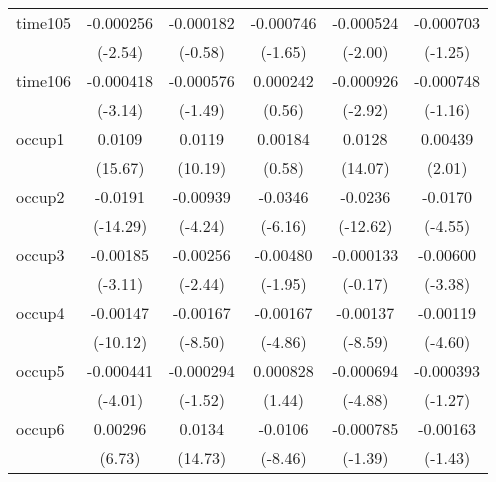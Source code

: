 \begin{table}[htbp]
\begin{tabular}{l*{5}{c}}
time105     &   -0.000256\sym{*}  &   -0.000182         &   -0.000746         &   -0.000524\sym{*}  &   -0.000703         \\
            &     (-2.54)         &     (-0.58)         &     (-1.65)         &     (-2.00)         &     (-1.25)         \\
time106     &   -0.000418\sym{**} &   -0.000576         &    0.000242         &   -0.000926\sym{**} &   -0.000748         \\
            &     (-3.14)         &     (-1.49)         &      (0.56)         &     (-2.92)         &     (-1.16)         \\
occup1      &      0.0109\sym{***}&      0.0119\sym{***}&     0.00184         &      0.0128\sym{***}&     0.00439\sym{*}  \\
            &     (15.67)         &     (10.19)         &      (0.58)         &     (14.07)         &      (2.01)         \\
occup2      &     -0.0191\sym{***}&    -0.00939\sym{***}&     -0.0346\sym{***}&     -0.0236\sym{***}&     -0.0170\sym{***}\\
            &    (-14.29)         &     (-4.24)         &     (-6.16)         &    (-12.62)         &     (-4.55)         \\
occup3      &    -0.00185\sym{**} &    -0.00256\sym{*}  &    -0.00480         &   -0.000133         &    -0.00600\sym{***}\\
            &     (-3.11)         &     (-2.44)         &     (-1.95)         &     (-0.17)         &     (-3.38)         \\
occup4      &    -0.00147\sym{***}&    -0.00167\sym{***}&    -0.00167\sym{***}&    -0.00137\sym{***}&    -0.00119\sym{***}\\
            &    (-10.12)         &     (-8.50)         &     (-4.86)         &     (-8.59)         &     (-4.60)         \\
occup5      &   -0.000441\sym{***}&   -0.000294         &    0.000828         &   -0.000694\sym{***}&   -0.000393         \\
            &     (-4.01)         &     (-1.52)         &      (1.44)         &     (-4.88)         &     (-1.27)         \\
occup6      &     0.00296\sym{***}&      0.0134\sym{***}&     -0.0106\sym{***}&   -0.000785         &    -0.00163         \\
            &      (6.73)         &     (14.73)         &     (-8.46)         &     (-1.39)         &     (-1.43)         \\

\end{tabular}
\end{table}
